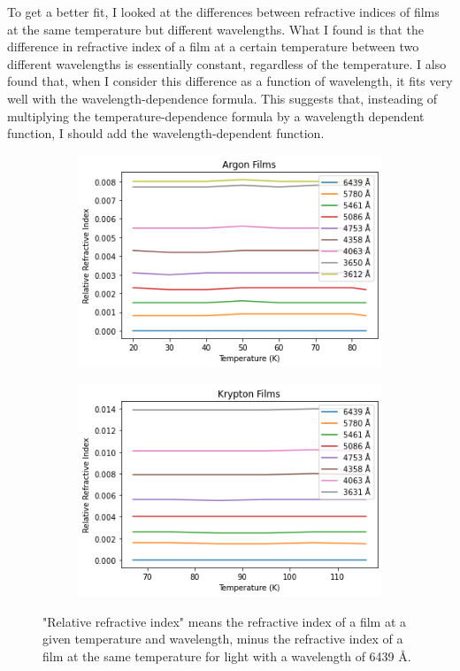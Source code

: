 \documentclass[letterpaper,12pt]{article}
\begin{document}
To get a better fit, I looked at the differences between refractive indices of films at the same temperature but different wavelengths. What I found is that the difference in refractive index of a film at a certain temperature between two different wavelengths is essentially constant, regardless of the temperature. I also found that, when I consider this difference as a function of wavelength, it fits very well with the wavelength-dependence formula. This suggests that, insteading of multiplying the temperature-dependence formula by a wavelength dependent function, I should add the wavelength-dependent function.
\begin{figure}[h!]
	\begin{subfigure}[t]{0.5\linewidth}
		\centering
		\includegraphics[width=\textwidth,height=\textheight,keepaspectratio]{argon3.png}
	\end{subfigure}
	\begin{subfigure}[t]{0.5\linewidth}
		\centering
		\includegraphics[width=\textwidth,height=\textheight,keepaspectratio]{krypton3.png}
	\end{subfigure}
	\caption{"Relative refractive index" means the refractive index of a film at a given temperature and wavelength, minus the refractive index of a film at the same temperature for light with a wavelength of 6439 Å.}
\end{figure}
\end{document}
